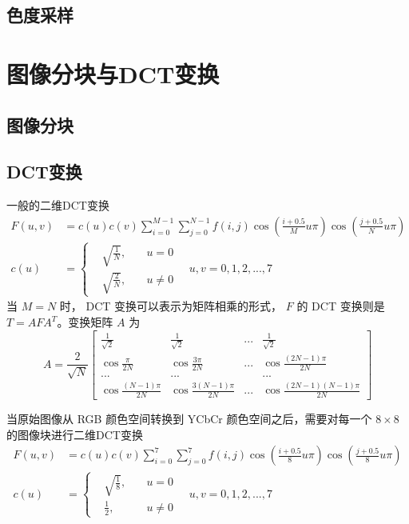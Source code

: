\subsection{色度采样}
\section{图像分块与DCT变换}
\subsection{图像分块}
\subsection{DCT变换}

一般的二维DCT变换
\begin{equation}
    \begin{aligned}
        F(u,v) &=c(u)c(v) \sum_{i=0}^{M-1} \sum_{j=0}^{N-1} f(i,j) \cos(\frac{i+0.5}{M}u\pi) \cos(\frac{j+0.5}{N}u\pi) \\
        c(u) &=\left\{\begin{aligned}
            & \sqrt{\frac{1}{N}}, & \quad u=0 \\
            & \sqrt{\frac{2}{N}}, & \quad u\neq 0
        \end{aligned}\right.
        \quad u,v=0,1,2,...,7
    \end{aligned}
\end{equation}
当 $M=N$ 时， DCT 变换可以表示为矩阵相乘的形式， $F$ 的 DCT 变换则是 $T=AFA^T$。变换矩阵 $A$ 为
\begin{equation}
    A=\frac{2}{\sqrt{N}}
    \begin{bmatrix}
        \frac{1}{\sqrt{2}}      & \frac{1}{\sqrt{2}}        & ...   & \frac{1}{\sqrt{2}} \\
        \cos\frac{\pi}{2N}      & \cos\frac{3\pi}{2N}       & ...   & \cos\frac{(2N-1)\pi}{2N} \\
        ...                     & ...                       &       & ... \\
        \cos\frac{(N-1)\pi}{2N} & \cos\frac{3(N-1)\pi}{2N}  & ...   & \cos\frac{(2N-1)(N-1)\pi}{2N}
    \end{bmatrix}
\end{equation}




当原始图像从 RGB 颜色空间转换到 YCbCr 颜色空间之后，需要对每一个 $8 \times 8$ 的图像块进行二维DCT变换
\begin{equation}
    \begin{aligned}
        F(u,v) &=c(u)c(v) \sum_{i=0}^{7} \sum_{j=0}^{7} f(i,j) \cos(\frac{i+0.5}{8}u\pi) \cos(\frac{j+0.5}{8}u\pi) \\
        c(u) &=\left\{\begin{aligned}
            & \sqrt{\frac{1}{8}},   & \quad u=0 \\
            & \frac{1}{2},          & \quad u\neq 0
        \end{aligned}\right.
        \quad u,v=0,1,2,...,7
    \end{aligned}
\end{equation}

